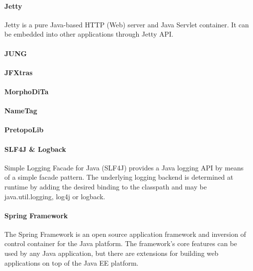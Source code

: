 \paragraph{Jetty}
Jetty is a pure Java-based HTTP (Web) server and Java Servlet container. It can
be embedded into other applications through Jetty API.

\paragraph{JUNG}

\paragraph{JFXtras}

\paragraph{MorphoDiTa}
\paragraph{NameTag}

\paragraph{PretopoLib}

\paragraph{SLF4J \& Logback}
Simple Logging Facade for Java (SLF4J) provides a Java logging API by means
of a simple facade pattern. The underlying logging backend is determined
at runtime by adding the desired binding to the classpath and may be
java.util.logging, log4j or logback.

\paragraph{Spring Framework}
The Spring Framework is an open source application framework and inversion
of control container for the Java platform. The framework's core features
can be used by any Java application, but there are extensions for building
web applications on top of the Java EE platform.